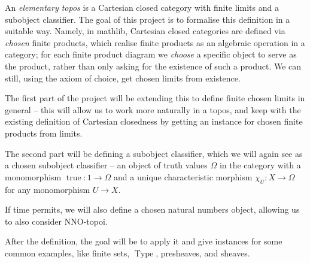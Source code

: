 %

An \emph{elementary topos} is a Cartesian closed category with finite limits and a subobject classifier. The goal of this project is to formalise this definition in a suitable way. Namely, in mathlib, Cartesian closed categories are defined via \emph{chosen} finite products, which realise finite products as an algebraic operation in a category; for each finite product diagram we \emph{choose} a specific object to serve as the product, rather than only asking for the existence of such a product. We can still, using the axiom of choice, get chosen limits from existence.

The first part of the project will be extending this to define finite chosen limits in general -- this will allow us to work more naturally in a topos, and keep with the existing definition of Cartesian closedness by getting an instance for chosen finite products from limits.

The second part will be defining a subobject classifier, which we will again see as a chosen subobject classifier -- an object of truth values $\Omega$ in the category with a monomorphism $\operatorname{true} : 1 \rightarrow \Omega$ and a unique characteristic morphism $\chi_{U} : X \rightarrow \Omega$ for any monomorphism $U \rightarrow X$.

If time permits, we will also define a chosen natural numbers object, allowing us to also consider NNO-topoi.

After the definition, the goal will be to apply it and give instances for some common examples, like finite sets, $\operatorname{Type}$, presheaves, and sheaves.
